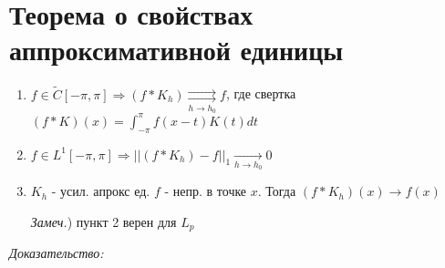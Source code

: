 \documentclass[paper=a4, fontsize=17pt]{article}
\begin{document}
\section{Теорема о свойствах аппроксимативной единицы}
\begin{enumerate}
    \item $f \in \widetilde{C}[-\pi, \pi] \Rightarrow (f * K_h) \underset{h \rightarrow h_0}{\rightrightarrows} f $, где
    свертка $(f* K)(x) = \int_{-\pi}^{\pi} f(x-t)K(t)dt$
    
    \item $f \in L^1 [-\pi, \pi] \Rightarrow ||(f * K_h) - f||_1 \underset{h \rightarrow h_0}{\rightarrow} 0 $
    \item $K_h$ - усил. апрокс ед. $f$ - непр. в точке $x$. Тогда $(f * K_h)(x) \rightarrow f(x)$

    \emph{Замеч.}) пункт 2 верен для $ L_p $
\end{enumerate}
\emph{Доказательство:}
\end{document}
